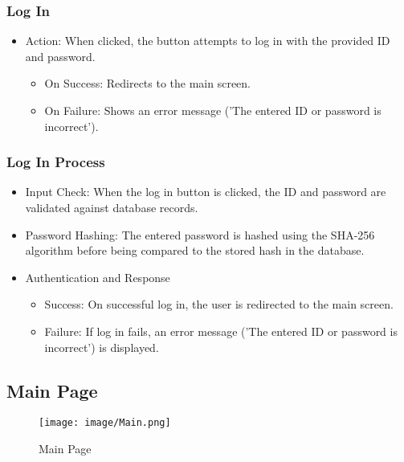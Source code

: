 \documentclass[conference]{IEEEtran}
\begin{document}
\subsubsection{Log In}
\begin{itemize}
    \item Action: When clicked, the button attempts to log in with the provided ID and password.
\begin{itemize}
    \item On Success: Redirects to the main screen.\\
    \item On Failure: Shows an error message ('The entered ID or password is incorrect').\\
\end{itemize}
\end{itemize}

\subsubsection{Log In Process}
\begin{itemize}
    \item Input Check: When the log in button is clicked, the ID and password are validated against database records.\\
    \item Password Hashing: The entered password is hashed using the SHA-256 algorithm before being compared to the stored hash in the database.\\
    \item Authentication and Response
\begin{itemize}
    \item Success: On successful log in, the user is redirected to the main screen.\\
    \item Failure: If log in fails, an error message ('The entered ID or password is incorrect') is displayed.\\
\end{itemize}
\end{itemize}

\clearpage

\subsection{Main Page}

\begin{figure}[h!]
    \centering
    \texttt{[image: image/Main.png]}
    \caption{Main Page}
    \label{fig:enter-label}
\end{figure}
\end{document}
